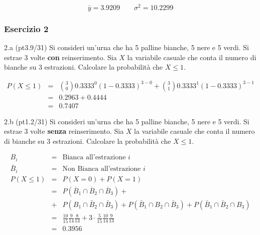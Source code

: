 \documentclass[
  10pt,
]{article}
\begin{document}
\begin{sol}
\[
\bar y = 3.9209\qquad \sigma^2 = 10.2299
\]

\end{sol}

\subsubsection{Esercizio 2}\label{esercizio-2}

2.a (pt\hspace{.1em}3.9/31) Si consideri un'urna che ha 5 palline bianche, 5 nere e 5 verdi. Si estrae 3 volte \textbf{con} reinserimento. Sia \(X\) la variabile casuale che conta il numero di bianche su 3 estrazioni. Calcolare la probabilità che \(X\leq 1\).

\begin{sol}
\normalsize 
\begin{eqnarray*}
      P( X \leq 1 ) &=& \binom{ 3 }{ 0 } 0.3333 ^{ 0 }(1- 0.3333 )^{ 3 - 0 }+\binom{ 3 }{ 1 } 0.3333 ^{ 1 }(1- 0.3333 )^{ 3 - 1 } \\                 &=& 0.2963+0.4444 \\                 &=& 0.7407 
   \end{eqnarray*}
\normalsize 

\end{sol}

2.b (pt\hspace{.1em}1.2/31) Si consideri un'urna che ha 5 palline bianche, 5 nere e 5 verdi. Si estrae 3 volte \textbf{senza} reinserimento. Sia \(X\) la variabile casuale che conta il numero di bianche su 3 estrazioni. Calcolare la probabilità che \(X\leq 1\).

\begin{sol}
\begin{eqnarray*}
  B_i &=& \text{Bianca all'estrazione $i$}\\
  \bar B_i &=& \text{Non Bianca all'estrazione $i$}\\
  P(X\le 1) &=&  P(X=0) + P(X=1)\\
   &=& P(\bar B_1\cap\bar B_2\cap\bar B_3)+\\
   &+&P(B_1\cap\bar B_2 \cap \bar B_3)+P(\bar B_1\cap B_2 \cap \bar B_3)+P(\bar B_1\cap\bar B_2 \cap B_3)\\
   &=& \frac {10}{15}\frac {9}{14}\frac {8}{13}+3\cdot\frac {5}{15}\frac {10}{14}\frac {9}{13}\\
  &=& 0.3956
\end{eqnarray*}

\end{sol}
\end{document}
